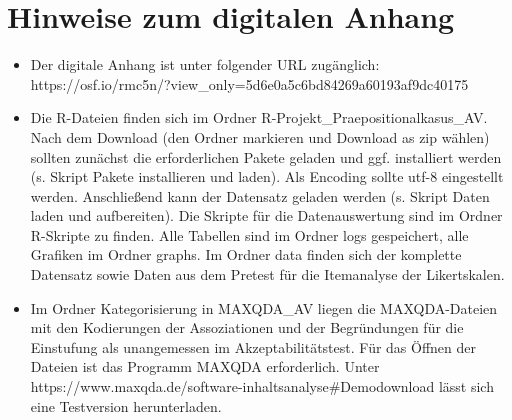 \section*{Hinweise zum digitalen Anhang}
\label{sec:AnhHinweisDigitalerAnh}
\begin{itemize}
\item Der digitale Anhang ist unter folgender URL zugänglich:\\
https://osf.io/rmc5n/?view\_only=5d6e0a5c6bd84269a60193af9dc40175
\item Die R-Dateien finden sich im Ordner  R-Projekt\_Praepositionalkasus\_AV\grqq{}. 
Nach dem Download (den Ordner markieren und \glqq Download as zip\grqq{} wählen) sollten zunächst die erforderlichen Pakete geladen und ggf. installiert werden (s. Skript  Pakete installieren und laden\grqq). 
Als Encoding sollte utf-8 eingestellt werden.
Anschließend kann der Datensatz geladen werden (s. Skript  Daten laden und aufbereiten\grqq). 
Die Skripte für die Datenauswertung sind im Ordner \glqq R-Skripte\grqq{} zu finden. 
Alle Tabellen sind im Ordner \glqq logs\grqq{} gespeichert, alle Grafiken im Ordner \glqq graphs\grqq.
Im Ordner \glqq data\grqq{} finden sich der komplette Datensatz sowie Daten aus dem Pretest für die Itemanalyse der Likertskalen. 
\item Im Ordner  Kategorisierung in MAXQDA\_AV\grqq{} liegen die MAXQDA-Dateien mit den Kodierungen der Assoziationen und der Begründungen für die Einstufung als unangemessen im Akzeptabilitätstest. 
Für das Öffnen der Dateien ist das Programm MAXQDA erforderlich. 
Unter https://www.maxqda.de/software-inhaltsanalyse\#Demodownload lässt sich eine Testversion herunterladen. 
\end{itemize}
